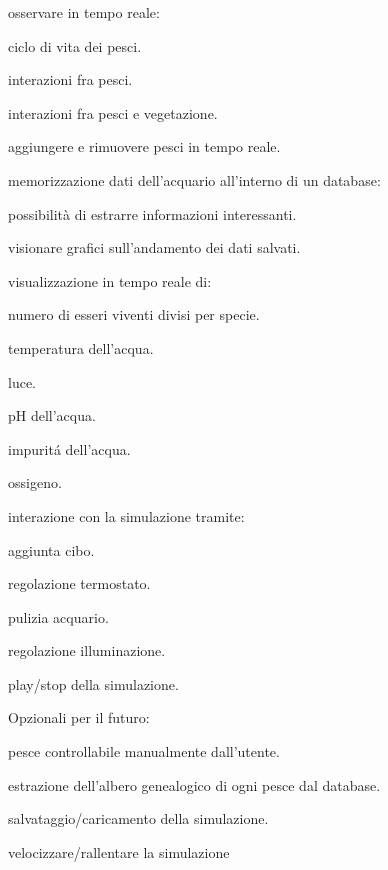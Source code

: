 \documentclass[12pt,a4paper,oneside,article]{article}
\begin{document}
	\begin{legal}[label*=2.\arabic*.]
    	\item osservare in tempo reale:
    	\begin{legal}
    		\item ciclo di vita dei pesci.
    		\item interazioni fra pesci.
    		\item interazioni fra pesci e vegetazione.
    	\end{legal}
    	\item aggiungere e rimuovere pesci in tempo reale.
    	\item memorizzazione dati dell'acquario all’interno di un database:
    	\begin{legal}
    		\item possibilità di estrarre informazioni interessanti.
    		\item visionare grafici sull'andamento dei dati salvati.
    	\end{legal}
    	\item visualizzazione in tempo reale di:
    	\begin{legal}
    		\item numero di esseri viventi divisi per specie.
    		\item temperatura dell’acqua.
    		\item luce.
    		\item pH dell’acqua.
    		\item impurit\'a dell’acqua.
    		\item ossigeno.
    	\end{legal}
    	\item interazione con la simulazione tramite:
    	\begin{legal}
    		\item aggiunta cibo.
    		\item regolazione termostato.
    		\item pulizia acquario.
    		\item regolazione illuminazione.
    		\item play/stop della simulazione.
    	\end{legal}
    	\item Opzionali per il futuro:
    	\begin{legal}
    		\item pesce controllabile manualmente dall’utente.
    		\item estrazione dell’albero genealogico di ogni pesce dal database.
    		\item salvataggio/caricamento della simulazione.
    		\item velocizzare/rallentare la simulazione
    	\end{legal}
    \end{legal}
    
\end{document}
